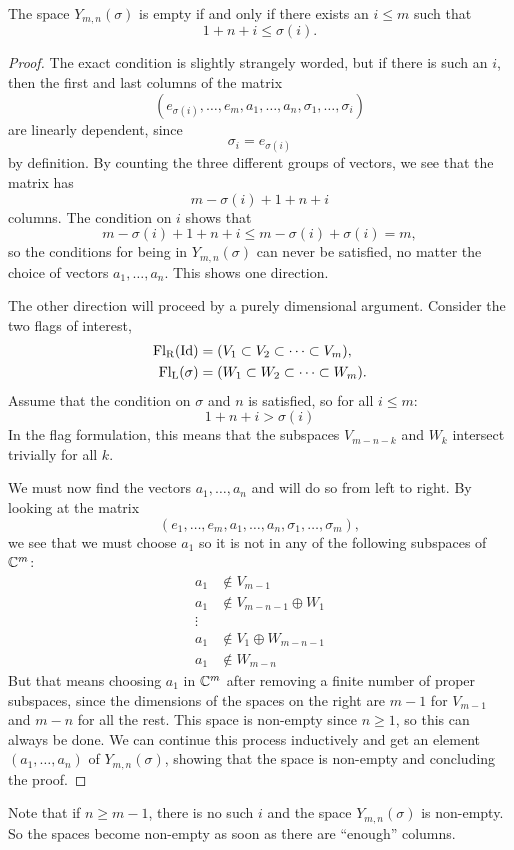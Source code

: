 \begin{lemma}
  The space $Y_{m,n}(\sigma)$ is empty if and only if there exists an
  $i \leq m$ such that
  \[ 1 + n + i \leq \sigma(i). \]
\end{lemma}
\begin{proof}
  The exact condition is slightly strangely worded, but if there is
  such an $i$, then the first and last columns of the matrix
  \[ (e_{\sigma(i)},\dots,e_m,a_1,\dots,a_n,\sigma_1,\dots,\sigma_i) \]
  are linearly dependent, since
  \[ \sigma_i = e_{\sigma(i)} \]
  by definition. By counting the three different groups of vectors, we
  see that the matrix has
  \[ m - \sigma(i) + 1 + n + i \]
  columns. The condition on $i$ shows that
  \[ m - \sigma(i) + 1 + n + i \leq m - \sigma(i) + \sigma(i) = m, \]
  so the conditions for being in $Y_{m,n}(\sigma)$ can never be
  satisfied, no matter the choice of vectors $a_1,\dots,a_n$. This
  shows one direction.

  The other direction
  will proceed by a purely dimensional argument. Consider the two
  flags of interest,
  \begin{align*}
    \mathrm{Fl_R}(\operatorname{Id}) &= (V_1 \subset V_2 \subset \dots \subset V_m),
    \\
    \mathrm{Fl_L}(\sigma) &= (W_1 \subset W_2 \subset \dots \subset
    W_m).
  \end{align*}
  Assume that the condition on $\sigma$ and $n$ is satisfied, so for
  all $i \leq m$:
  \[ 1 + n + i > \sigma(i) \]
  In the flag formulation, this means that the subspaces $V_{m-n-k}$
  and $W_k$ intersect trivially for all $k$.

  We must now find the vectors $a_1,\dots,a_n$ and will do so from
  left to right. By looking at the matrix
  \[ \left( e_1, \dots, e_m, a_1, \dots, a_n, \sigma_1, \dots,
    \sigma_m \right), \]
  we see that we must choose $a_1$ so it is not in any of the
  following subspaces of $\mathbb{C}^m$:
  \begin{align*}
    a_1 &\not\in V_{m-1} \\
    a_1 &\not\in V_{m-n-1} \oplus W_1 \\
    \vdots & \\
    a_1 &\not\in V_1\oplus W_{m-n-1} \\
    a_1 &\not\in W_{m-n}
  \end{align*}
  But that means choosing $a_1$ in $\mathbb{C}^m$ after removing a
  finite number of proper subspaces, since the dimensions of the
  spaces on the right are $m-1$ for $V_{m-1}$ and $m-n$ for
  all the rest. This space is non-empty since $n\geq 1$, so this can
  always be done. We can continue this process inductively and get an
  element $(a_1,\dots,a_n)$ of $Y_{m,n}(\sigma)$, showing that the
  space is non-empty and concluding the proof.
\end{proof}
\begin{remark}
  Note that if $n \geq m-1$, there is no such $i$ and the space
  $Y_{m,n}(\sigma)$ is non-empty. So the spaces become non-empty as
  soon as there are ``enough'' columns.
\end{remark}

